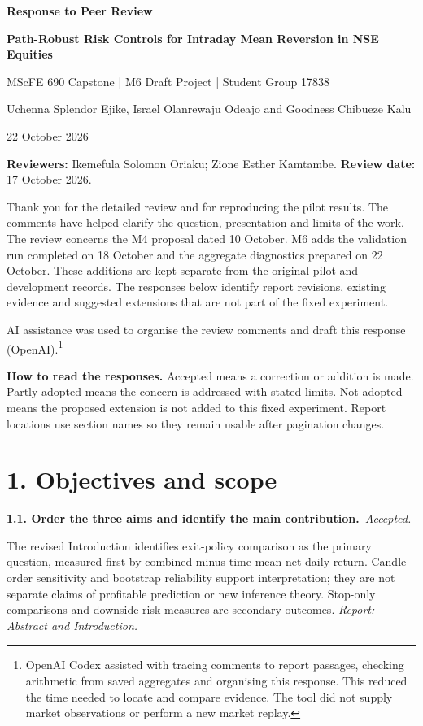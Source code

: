 \documentclass[11pt,a4paper]{article}
\newcommand{\Needspace}[1]{\par\begingroup\ifdim\dimexpr\pagegoal-\pagetotal\relax<#1\relax\newpage\fi\endgroup}
\newcommand{\reply}[3]{\par\addvspace{5pt}\noindent\textbf{#1. #2}\ \textit{#3.}\par\nobreak}
\begin{document}
\justifying
\begin{center}
{\fontsize{15}{18}\selectfont\bfseries Response to Peer Review\par}
\vspace{3pt}
{\fontsize{12}{14.4}\selectfont\bfseries Path-Robust Risk Controls for Intraday Mean Reversion in NSE Equities\par}
\vspace{5pt}
MScFE 690 Capstone | M6 Draft Project | Student Group 17838\par
Uchenna Splendor Ejike, Israel Olanrewaju Odeajo and Goodness Chibueze Kalu\par
22 October 2026
\end{center}
\vspace{3pt}
\textbf{Reviewers:} Ikemefula Solomon Oriaku; Zione Esther Kamtambe. \textbf{Review date:} 17 October 2026.\par
Thank you for the detailed review and for reproducing the pilot results. The comments have helped clarify the question, presentation and limits of the work. The review concerns the M4 proposal dated 10 October. M6 adds the validation run completed on 18 October and the aggregate diagnostics prepared on 22 October. These additions are kept separate from the original pilot and development records. The responses below identify report revisions, existing evidence and suggested extensions that are not part of the fixed experiment.

AI assistance was used to organise the review comments and draft this response (OpenAI).\footnote{OpenAI Codex assisted with tracing comments to report passages, checking arithmetic from saved aggregates and organising this response. This reduced the time needed to locate and compare evidence. The tool did not supply market observations or perform a new market replay.}

\textbf{How to read the responses.} Accepted means a correction or addition is made. Partly adopted means the concern is addressed with stated limits. Not adopted means the proposed extension is not added to this fixed experiment. Report locations use section names so they remain usable after pagination changes.
\Needspace{10\baselineskip}
\section*{1. Objectives and scope}
\par\noindent\begin{minipage}{\linewidth}\justifying
\reply{1.1}{Order the three aims and identify the main contribution.}{Accepted}
The revised Introduction identifies exit-policy comparison as the primary question, measured first by combined-minus-time mean net daily return. Candle-order sensitivity and bootstrap reliability support interpretation; they are not separate claims of profitable prediction or new inference theory. Stop-only comparisons and downside-risk measures are secondary outcomes.
{\small\textit{Report: Abstract and Introduction.}}
\end{minipage}\par\addvspace{5pt}
\end{document}
